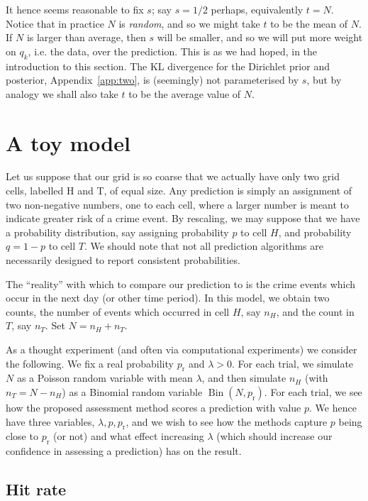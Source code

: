 \documentclass[twoside,a4paper,twocolumn,10pt]{article}
\theoremstyle{plain}
\theoremstyle{definition}
\begin{document}
It hence seems reasonable to fix $s$; say $s=1/2$ perhaps, equivalently $t = N$.
Notice that in practice $N$ is \emph{random}, and so we might take $t$ to be the
mean of $N$.  If $N$ is larger than average, then $s$ will be smaller, and so we will
put more weight on $q_k$, i.e. the data, over the prediction.  This is as we had hoped,
in the introduction to this section.  The KL divergence for the Dirichlet prior and
posterior, Appendix~\ref{app:two}, is (seemingly) not parameterised by $s$, but
by analogy we shall also take $t$ to be the average value of $N$.


\section{A toy model}

Let us suppose that our grid is so coarse that we actually have only two grid
cells, labelled H and T, of equal size.  Any prediction is simply an assignment of
two non-negative numbers, one to each cell, where a larger number is meant to indicate
greater risk of a crime event.  By rescaling, we may suppose that we have a probability
distribution, say assigning probability $p$ to cell $H$, and probability $q=1-p$ to
cell $T$.  We should note that not all prediction algorithms are necessarily designed
to report consistent probabilities.

The ``reality'' with which to compare our prediction to is the crime events which occur
in the next day (or other time period).  In this model, we obtain two counts, the number
of events which occurred in cell $H$, say $n_H$, and the count in $T$, say $n_T$.
Set $N = n_H + n_T$.

As a thought experiment (and often via computational experiments) we consider the following.
We fix a real probability $p_{\text{r}}$ and $\lambda>0$.  For each trial, we simulate
$N$ as a Poisson random variable with mean $\lambda$, and then simulate $n_H$ (with
$n_T = N-n_H$) as a Binomial random variable $\operatorname{Bin}(N, p_{\text{r}})$.
For each trial, we see how the proposed assessment method scores a prediction
with value $p$.  We hence have three variables, $\lambda, p, p_{\text{r}}$, and we
wish to see how the methods capture $p$ being close to $p_{\text{r}}$ (or not)
and what effect increasing $\lambda$ (which should increase our confidence in assessing
a prediction) has on the result.


\subsection{Hit rate}
\end{document}
